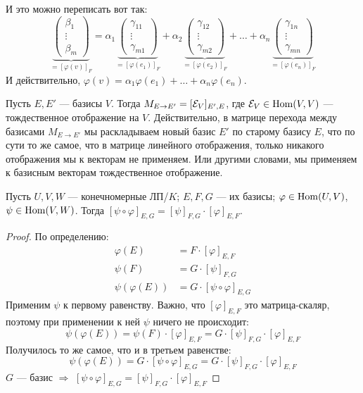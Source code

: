 И это можно переписать вот так:
$$
\underbrace{
\begin{pmatrix}
    \beta_1 \\
    \vdots \\ 
    \beta_m
\end{pmatrix}
}_{=[\varphi(v)]_F}
=
\alpha_1
\underbrace{
\begin{pmatrix}
    \gamma_{11} \\ 
    \vdots \\ 
    \gamma_{m1}
\end{pmatrix}
}_{=[\varphi(e_1)]_F}
+
\alpha_2
\underbrace{
\begin{pmatrix}
    \gamma_{12} \\ 
    \vdots \\ 
    \gamma_{m2}
\end{pmatrix}
}_{=[\varphi(e_2)]_F}
+
\dots
+
\alpha_n
\underbrace{
\begin{pmatrix}
    \gamma_{1n} \\ 
    \vdots \\ 
    \gamma_{mn}
\end{pmatrix}
}_{=[\varphi(e_n)]_F}
$$
И действительно, 
$\varphi(v) = \alpha_1 \varphi(e_1) + \dots + \alpha_n \varphi(e_n)$.

\notice Пусть $E, E'$ --- базисы $V$. Тогда $M_{E \to E'} =
[\mathcal{E}_V]_{E', E}$, где $\mathcal{E}_V \in \operatorname{Hom}(V, V)$ --- тождественное отображение на $V$.
Действительно, в матрице перехода между базисами 
$M_{E \to E'}$ мы раскладываем новый базис $E'$ по старому базису $E$,
что по сути то же самое, что в матрице линейного отображения, только
никакого отображения мы к векторам не применяем. Или другими словами,
мы применяем к базисным векторам тождественное отображение.

\begin{theorem}
    Пусть $U, V, W$ --- конечномерные ЛП/$K$; $E, F, G$ --- их базисы;
    $\varphi \in \operatorname{Hom}(U, V)$, $\psi \in \operatorname{Hom}(V, W)$. Тогда
    $[\psi \circ \varphi]_{E,G} = [\psi]_{F,G} \cdot [\varphi]_{E,F}$.
\end{theorem}
\begin{proof}
    По определению:
    \begin{align*}
        \varphi(E) &= F \cdot [\varphi]_{E, F} \\
        \psi(F) &= G \cdot [\psi]_{F, G} \\
        \psi(\varphi(E)) &= G \cdot [\psi \circ \varphi]_{E, G} 
    \end{align*}
    Применим $\psi$ к первому равенству.
    Важно, что $[\varphi]_{E, F}$ это матрица-скаляр, поэтому при применении к ней $\psi$ ничего не происходит:
    \[ \psi(\varphi(E)) = \psi(F) \cdot [\varphi]_{E, F} = G \cdot [\psi]_{F, G} \cdot [\varphi]_{E, F}  \]
    Получилось то же самое, что и в третьем равенстве:
    \[ \psi(\varphi(E)) = G \cdot [\psi \circ \varphi]_{E, G} = G \cdot [\psi]_{F, G} \cdot [\varphi]_{E, F}  \]
    $G$ --- базис $\Longrightarrow$ 
    $[\psi \circ \varphi]_{E,G} = [\psi]_{F,G} \cdot [\varphi]_{E,F}$
\end{proof}

